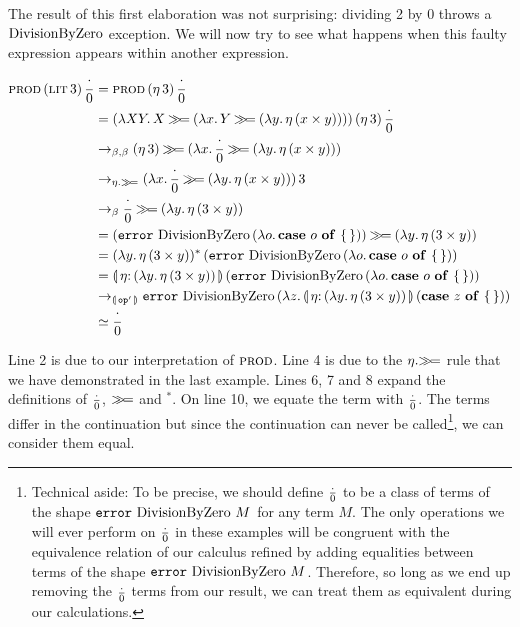 The result of this first elaboration was not surprising: dividing 2 by 0
throws a $\operatorname{DivisionByZero}$ exception. We will now try to see what happens when
this faulty expression appears within another expression.

\begin{align}
  \app{\prode}{\litec{3}}{\dbze}
  &= \app{\prode}{(\ap{\eta}{3})}{\dbze} \\
  &= \app{(\lam{X Y}{X \hsbind (\lam{x}{Y \hsbind (\lam{y}{\ap{\eta}
          {(x \times y)}})})})}
      {(\ap{\eta}{3})}{\dbze} \\
  &\to_{\beta,\beta} (\ap{\eta}{3}) \hsbind (\lam{x}{\dbze \hsbind (\lam{y}{\ap{\eta}
          {(x \times y)}})}) \\
  &\to_{\eta.\hsbind} \ap{(\lam{x}{\dbze \hsbind (\lam{y}{\ap{\eta}
          {(x \times y)}})})}{3} \\
  &\to_{\beta} \dbze \hsbind (\lam{y}{\ap{\eta} {(3 \times y)}}) \\
  &= (\app{\op{error}}{\dbzelong}{(\lam{o}{\absurd{o}})}) \hsbind (\lam{y}{\ap{\eta} {(3 \times y)}}) \\
  &= \ap{(\lam{y}{\ap{\eta} {(3 \times y)}})^*}{(\app{\op{error}}{\dbzelong}{(\lam{o}{\absurd{o}})})} \\
  &= \ap{\banana{\onto{\eta}{(\lam{y}{\ap{\eta} {(3 \times y)}})}}}{(\app{\op{error}}{\dbzelong}{(\lam{o}{\absurd{o}})})} \\
  &\to_{\banana{\op{op}'}} \app{\op{error}}{\dbzelong}{(\lam{z}{\ap{\banana{\onto{\eta}{(\lam{y}{\ap{\eta} {(3 \times y)}})}}}{(\absurd{z})}})} \\
  &\simeq \dbze
\end{align}
\setcounter{equation}{0}

Line 2 is due to our interpretation of $\textsc{prod}$. Line 4 is due to the
$\eta.\mathbin{\gg\!=}$ rule that we have demonstrated in the last example. Lines 6,
7 and 8 expand the definitions of $\frac{\cdot}{0}$, $\mathbin{\gg\!=}$ and $^*$. On line 10,
we equate the term with $\frac{\cdot}{0}$. The terms differ in the continuation but
since the continuation can never be called\footnote{Technical aside: To be
  precise, we should define $\frac{\cdot}{0}$ to be a class of terms of the shape
  $\mathtt{error}\,\operatorname{DivisionByZero}\,M$ for any term $M$. The only operations we
  will ever perform on $\frac{\cdot}{0}$ in these examples will be congruent with the
  equivalence relation of our calculus refined by adding equalities between
  terms of the shape $\mathtt{error}\,\operatorname{DivisionByZero}\,M$. Therefore, so long
  as we end up removing the $\frac{\cdot}{0}$ terms from our result, we can treat
  them as equivalent during our calculations.}, we can consider them equal.

